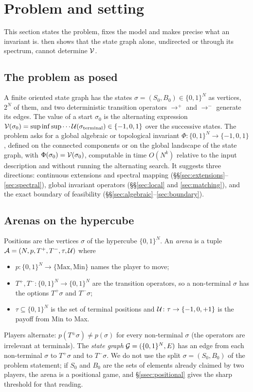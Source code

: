 \section{Problem and setting}\label{sec:setting}

This section states the problem, fixes the model and makes precise what an invariant is.  then shows that the state graph alone, undirected or through its spectrum, cannot determine $\mathcal{V}$.

\subsection*{The problem as posed}
A finite oriented state graph has the states $\sigma=(S_0,B_0)\in\{0,1\}^N$ as vertices, $2^N$ of them, and two deterministic transition operators $\to^{+}$ and $\to^{-}$ generate its edges. The value of a start $\sigma_0$ is the alternating expression $\mathcal{V}(\sigma_0)=\sup\inf\sup\cdots\mathcal{U}(\sigma_{\mathrm{terminal}})\in\{-1,0,1\}$ over the successive states. The problem asks for a global algebraic or topological invariant $\Phi\colon\{0,1\}^N\to\{-1,0,1\}$, defined on the connected components or on the global landscape of the state graph, with $\Phi(\sigma_0)=\mathcal{V}(\sigma_0)$, computable in time $O(N^k)$ relative to the input description and without running the alternating search. It suggests three directions: continuous extensions and spectral mapping (\S\S\ref{sec:extensions}--\ref{sec:spectral}), global invariant operators (\S\S\ref{sec:local} and \ref{sec:matching}), and the exact boundary of feasibility (\S\S\ref{sec:algebraic}--\ref{sec:boundary}).

\subsection{Arenas on the hypercube}\label{ssec:arenas}
Positions are the vertices $\sigma$ of the hypercube $\{0,1\}^N$. An \emph{arena} is a tuple $\mathcal{A}=(N,p,T^{+},T^{-},\tau,\mathcal{U})$ where
\begin{itemize}
\item $p\colon\{0,1\}^N\to\{\mathrm{Max},\mathrm{Min}\}$ names the player to move;
\item $T^{+},T^{-}\colon\{0,1\}^N\to\{0,1\}^N$ are the transition operators, so a non-terminal $\sigma$ has the options $T^{+}\sigma$ and $T^{-}\sigma$;
\item $\tau\subseteq\{0,1\}^N$ is the set of terminal positions and $\mathcal{U}\colon\tau\to\{-1,0,+1\}$ is the payoff from Min to Max.
\end{itemize}
Players alternate: $p(T^{\pm}\sigma)\neq p(\sigma)$ for every non-terminal $\sigma$ (the operators are irrelevant at terminals). The \emph{state graph} $\mathcal{G}=(\{0,1\}^N,E)$ has an edge from each non-terminal $\sigma$ to $T^{+}\sigma$ and to $T^{-}\sigma$. We do not use the split $\sigma=(S_0,B_0)$ of the problem statement; if $S_0$ and $B_0$ are the sets of elements already claimed by two players, the arena is a positional game, and \S\ref{ssec:positional} gives the sharp threshold for that reading.

